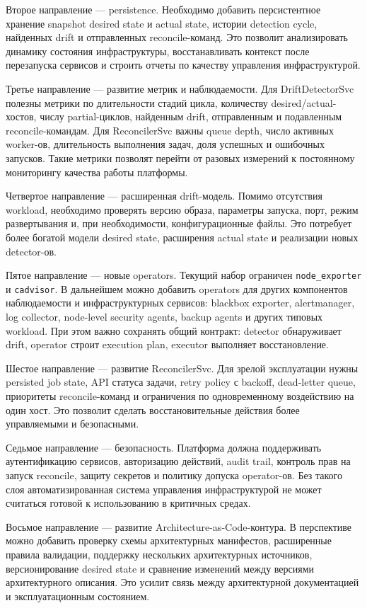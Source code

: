 Второе направление --- persistence. Необходимо добавить персистентное хранение snapshot desired state и actual state, истории detection cycle, найденных drift и отправленных reconcile-команд. Это позволит анализировать динамику состояния инфраструктуры, восстанавливать контекст после перезапуска сервисов и строить отчеты по качеству управления инфраструктурой.

Третье направление --- развитие метрик и наблюдаемости. Для DriftDetectorSvc полезны метрики по длительности стадий цикла, количеству desired/actual-хостов, числу partial-циклов, найденным drift, отправленным и подавленным reconcile-командам. Для ReconcilerSvc важны queue depth, число активных worker-ов, длительность выполнения задач, доля успешных и ошибочных запусков. Такие метрики позволят перейти от разовых измерений к постоянному мониторингу качества работы платформы.

Четвертое направление --- расширенная drift-модель. Помимо отсутствия workload, необходимо проверять версию образа, параметры запуска, порт, режим развертывания и, при необходимости, конфигурационные файлы. Это потребует более богатой модели desired state, расширения actual state и реализации новых detector-ов.

Пятое направление --- новые operators. Текущий набор ограничен \texttt{node\_exporter} и \texttt{cadvisor}. В дальнейшем можно добавить operators для других компонентов наблюдаемости и инфраструктурных сервисов: blackbox exporter, alertmanager, log collector, node-level security agents, backup agents и других типовых workload. При этом важно сохранять общий контракт: detector обнаруживает drift, operator строит execution plan, executor выполняет восстановление.

Шестое направление --- развитие ReconcilerSvc. Для зрелой эксплуатации нужны persisted job state, API статуса задачи, retry policy с backoff, dead-letter queue, приоритеты reconcile-команд и ограничения по одновременному воздействию на один хост. Это позволит сделать восстановительные действия более управляемыми и безопасными.

Седьмое направление --- безопасность. Платформа должна поддерживать аутентификацию сервисов, авторизацию действий, audit trail, контроль прав на запуск reconcile, защиту секретов и политику допуска operator-ов. Без такого слоя автоматизированная система управления инфраструктурой не может считаться готовой к использованию в критичных средах.

Восьмое направление --- развитие Architecture-as-Code-контура. В перспективе можно добавить проверку схемы архитектурных манифестов, расширенные правила валидации, поддержку нескольких архитектурных источников, версионирование desired state и сравнение изменений между версиями архитектурного описания. Это усилит связь между архитектурной документацией и эксплуатационным состоянием.

